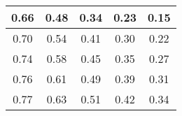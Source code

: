 \begin{large}\begin{tabular}{|c|c|c|c|c|}
\hline
0.66&0.48&0.34&0.23&0.15\\\hline
0.70&0.54&0.41&0.30&0.22\\\hline
0.74&0.58&0.45&0.35&0.27\\\hline
0.76&0.61&0.49&0.39&0.31\\\hline
0.77&0.63&0.51&0.42&0.34\\\hline
\end{tabular}
\end{large}